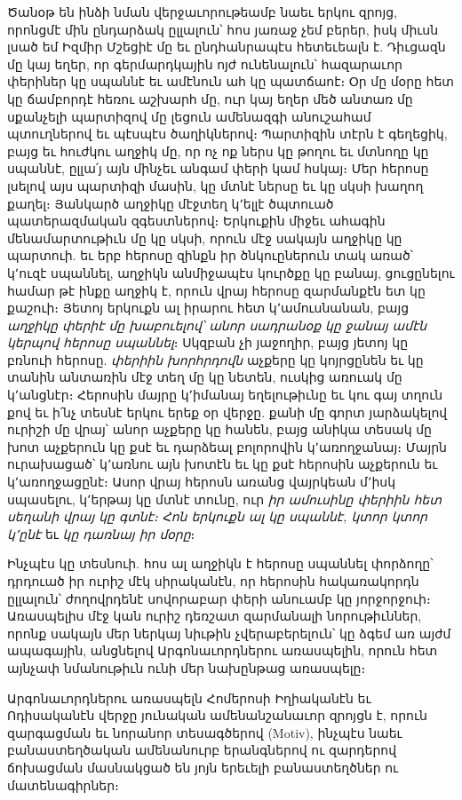 \documentclass{article}
\begin{document}
{Ծանօթ են ինձի նման վերջաւորութեամբ նաեւ երկու զրոյց, որոնցմէ մին ընդարձակ ըլլալուն՝ հոս յառաջ չեմ բերեր, իսկ միւսն լսած եմ Իզմիր Մշեցիէ մը եւ ընդհանրապէս հետեւեալն է. Դիւցազն մը կայ եղեր, որ գերմարդկային ոյժ ունենալուն՝ հազարաւոր փերիներ կը սպաննէ եւ ամէնուն ահ կը պատճաոէ։ Օր մը մօրը հետ կը ճամբորդէ հեռու աշխարհ մը, ուր կայ եղեր մեծ անտառ մը սքանչելի պարտիզով մը լեցուն ամենազգի անուշահամ պտուղներով եւ պէսպէս ծաղիկներով։ Պարտիզին տէրն է գեղեցիկ, բայց եւ հուժկու աղջիկ մը, որ ոչ ոք ներս կը թողու եւ մտնողը կը սպաննէ, ըլլա՛յ այն մինչեւ անգամ փերի կամ հսկայ։ Մեր հերոսը լսելով այս պարտիզի մասին, կը մտնէ ներսը եւ կը սկսի խաղող քաղել։ Յանկարծ աղջիկը մէջտեղ կ՚ելլէ ծպտուած պատերազմական զգեստներով։ Երկուքին միջեւ ահագին մենամարտութիւն մը կը սկսի, որուն մէջ սակայն աղջիկը կը պարտուի. եւ երբ հերոսը զինքն իր ծնկուըներուն տակ առած՝ կ՚ուզէ սպաննել, աղջիկն անմիջապէս կուրծքը կը բանայ, ցուցընելու համար թէ ինքը աղջիկ է, որուն վրայ հերոսը զարմանքէն ետ կը քաշուի։ Յետոյ երկուքն ալ իրարու հետ կ՚ամուսնանան, բայց \emph{աղջիկը փերիէ մը խաբուելով՝ անոր սադրանօք կը ջանայ ամէն կերպով հերոսը սպաննել}։ Սկզբան չի յաջողիր, բայց յետոյ կը բռնուի հերոսը. \emph{փերիին խորհրդովն} աչքերը կը կոյրցընեն եւ կը տանին անտառին մէջ տեղ մը կը նետեն, ուսկից առուակ մը կ՚անցնէր։ Հերոսին մայրը կ՚իմանայ եղելութիւնը եւ կու գայ տղուն քով եւ ի՛նչ տեսնէ երկու երեք օր վերջը. քանի մը գորտ յարձակելով ուրիշի մը վրայ՝ անոր աչքերը կը հանեն, բայց անիկա տեսակ մը խոտ աչքերուն կը քսէ եւ դարձեալ բոլորովին կ՚առողջանայ։ Մայրն ուրախացած՝ կ՚առնու այն խոտէն եւ կը քսէ հերոսին աչքերուն եւ կ՚առողջացընէ։ Ասոր վրայ հերոսն առանց վայրկեան մ՚իսկ սպասելու, կ՚երթայ կը մտնէ տունը, ուր \emph{իր ամուսինը փերիին հետ սեղանի վրայ կը գտնէ։ Հոն երկուքն ալ կը սպաննէ, կտոր կտոր կ՚ընէ} եւ \emph{կը դառնայ իր մօրը}։

Ինչպէս կը տեսնուի. հոս ալ աղջիկն է հերոսը սպաննել փորձողը՝ դրդուած իր ուրիշ մէկ սիրականէն, որ հերոսին հակառակորդն ըլլալուն՝ ժողովրդենէ սովորաբար փերի անուամբ կը յորջորջուի։ Առասպելիս մէջ կան ուրիշ դեռշատ զարմանալի նորութիւններ, որոնք սակայն մեր ներկայ նիւթին չվերաբերելուն՝ կը ձգեմ առ այժմ ապագային, անցնելով Արգոնաւորդներու առասպելին, որուն հետ այնչափ նմանութիւն ունի մեր նախընթաց առասպելը։

Արգոնաւորդներու առասպելն Հոմերոսի Իղիականէն եւ Ոդիսականէն վերջը յունական ամենանշանաւոր զրոյցն է, որուն զարգացման եւ նորանոր տեսագծերով (Motiv), ինչպէս նաեւ բանաստեղծական ամենանուրբ երանգներով ու զարդերով ճոխացման մասնակցած են յոյն երեւելի բանաստեղծներ ու մատենագիրներ։ 

}
\end{document}
